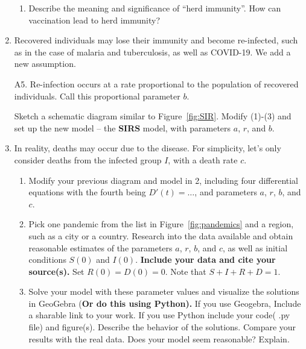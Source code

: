 \documentclass[10pt,letterpaper]{article}
\begin{document}
\begin{enumerate}
\begin{enumerate}
\item Describe the meaning and significance of ``herd immunity''. How can vaccination lead to herd immunity?

\end{enumerate}

\item Recovered individuals may lose their immunity and become re-infected, such as in the case of malaria and tuberculosis, as well as COVID-19. We add a new assumption.
\vspace*{.2 true cm}

A5. Re-infection occurs at a rate proportional to the population of recovered individuals. Call this proportional parameter $b$. 

\vspace*{.2 true cm}
Sketch a schematic diagram similar to Figure~\ref{fig:SIR}. Modify (1)-(3) and set up the new model -- the {\bf SIRS} model, with parameters $a$, $r$, and $b$.

\item In reality, deaths may occur due to the disease. For simplicity, let's only consider deaths from the infected group $I$, with a death rate $c$. 
\begin{enumerate}
\item Modify your previous diagram and model in 2, including four differential equations with the fourth being $D'(t)=\ldots$, and parameters $a$, $r$, $b$, and $c$. 
\item Pick one pandemic from the list in Figure~\ref{fig:pandemics} and a region, such as a city or a country. Research into the data available and obtain reasonable estimates of the parameters $a$, $r$, $b$, and $c$, as well as initial conditions $S(0)$ and $I(0)$. \textbf{Include your data and cite your source(s).} Set $R(0)=D(0)=0$. Note that $S+I+R+D=1$.
\item Solve your model with these parameter values and visualize the solutions in GeoGebra (\textbf{Or do this using Python).} If you use Geogebra, Include a sharable link to your work.  If you use Python include your code( .py file) and figure(s). Describe the behavior of the solutions. Compare your results with the real data. Does your model seem reasonable? Explain. 
\end{enumerate}

\end{enumerate}
\end{document}
